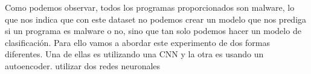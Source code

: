Como podemos observar, todos los programas proporcionados son malware, lo que nos indica que con este dataset no podemos crear un modelo que nos prediga si un programa es malware o no, sino que tan solo podemos hacer un modelo de clasificación. Para ello vamos a abordar este experimento de dos formas diferentes. Una de ellas es utilizando una CNN y la otra es usando un autoencoder. utilizar dos redes neuronales
